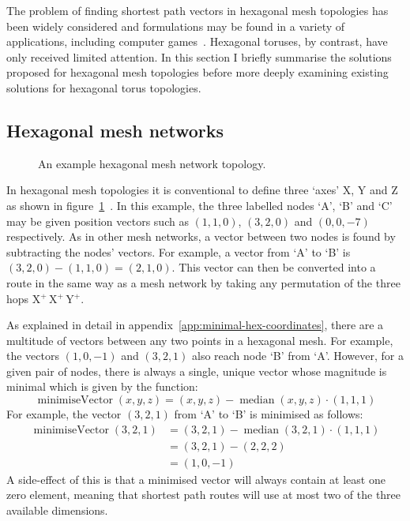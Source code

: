 		The problem of finding shortest path vectors in hexagonal mesh topologies
		has been widely considered and formulations may be found in a variety of
		applications, including computer games~\cite{patel15}. Hexagonal toruses,
		by contrast, have only received limited attention. In this section I
		briefly summarise the solutions proposed for hexagonal mesh topologies
		before more deeply examining existing solutions for hexagonal torus
		topologies.
		
		\subsection{Hexagonal mesh networks}
			
			\begin{figure}
				\center
				\caption{An example hexagonal mesh network topology.}
				\label{fig:hex-mesh-topology-coordinates}
			\end{figure}
			
			In hexagonal mesh topologies it is conventional to define three `axes' X,
			Y and Z as shown in
			figure~\ref{fig:hex-mesh-topology-coordinates}~\cite{patel15}. In this
			example, the three labelled nodes `A', `B' and `C' may be given position
			vectors such as $(1, 1, 0)$, $(3, 2, 0)$ and $(0, 0, -7)$ respectively.
			As in other mesh networks, a vector between two nodes is found by
			subtracting the nodes' vectors. For example, a vector from `A' to `B' is
			$(3, 2, 0) - (1, 1, 0) = (2, 1, 0)$. This vector can then be converted
			into a route in the same way as a mesh network by taking any permutation
			of the three hops  X$^+\,$X$^+\,$Y$^+$.
			
			As explained in detail in appendix~\ref{app:minimal-hex-coordinates},
			there are a multitude of vectors between any two points in a hexagonal
			mesh. For example, the vectors $(1, 0, -1)$ and $(3, 2, 1)$ also reach
			node `B' from `A'. However, for a given pair of nodes, there is always a
			single, unique vector whose magnitude is minimal which is given by the
			function:
			\begin{equation*}
				\operatorname{minimiseVector}(x,y,z) =
					(x,y,z) - \operatorname{median}(x,y,z) \cdot (1,1,1)
			\end{equation*}
			For example, the vector $(3, 2, 1)$ from `A' to `B' is minimised as
			follows:
			\begin{align*}
				\operatorname{minimiseVector}(3,2,1) &=
					(3,2,1) - \operatorname{median}(3,2,1) \cdot (1,1,1) \\
				&=
					(3,2,1) - (2,2,2) \\
				&=
					(1,0,-1)
			\end{align*}
			A side-effect of this is that a minimised vector will always contain at
			least one zero element, meaning that shortest path routes will use at most
			two of the three available dimensions.
		
